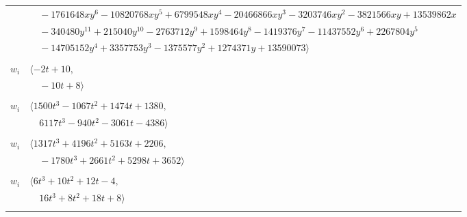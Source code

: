 \documentclass[11pt]{article}
\begin{document}
\begin{longtable}{@{}ll@{}}
 & $\quad -1761648xy^{6}-10820768xy^{5}+6799548xy^{4}-20466866xy^{3}-3203746xy^{2}-3821566xy+13539862x$\\
 & $\quad -340480y^{11}+215040y^{10}-2763712y^{9}+1598464y^{8}-1419376y^{7}-11437552y^{6}+2267804y^{5}$\\
 & $\quad -14705152y^{4}+3357753y^{3}-1375577y^{2}+1274371y+13590073\rangle$\\
\addlinespace[2pt]
\multicolumn{2}{@{}p{0.97\textwidth}@{}}{$i=12$, $D_i=2$, $\rho_{ij}$: $5{:}2, \allowbreak 23{:}1, \allowbreak 41{:}1, \allowbreak 42{:}1, \allowbreak 51{:}1$}\\
$w_i$ & $\langle -2t+10,$\\
 & $\quad -10t+8\rangle$\\
\addlinespace[2pt]
\multicolumn{2}{@{}p{0.97\textwidth}@{}}{$i=13$, $D_i=64$, $\rho_{ij}$: $4{:}1, \allowbreak 6{:}1, \allowbreak 10{:}1, \allowbreak 17{:}1, \allowbreak 23{:}1, \allowbreak 24{:}2, \allowbreak 30{:}1, \allowbreak 31{:}1, \allowbreak 36{:}1, \allowbreak 37{:}2, \allowbreak 39{:}2, \allowbreak 42{:}2, \allowbreak 43{:}1, \allowbreak 47{:}1, \allowbreak 52{:}2, \allowbreak 54{:}1, \allowbreak 71{:}1$}\\
$w_i$ & $\langle 1500t^{3}-1067t^{2}+1474t+1380,$\\
 & $\quad 6117t^{3}-940t^{2}-3061t-4386\rangle$\\
\addlinespace[2pt]
\multicolumn{2}{@{}p{0.97\textwidth}@{}}{$i=14$, $D_i=32$, $\rho_{ij}$: $2{:}1, \allowbreak 3{:}1, \allowbreak 4{:}1, \allowbreak 5{:}2, \allowbreak 6{:}1, \allowbreak 8{:}1, \allowbreak 10{:}1, \allowbreak 15{:}2, \allowbreak 35{:}2, \allowbreak 40{:}1, \allowbreak 41{:}2, \allowbreak 43{:}1, \allowbreak 45{:}2, \allowbreak 48{:}1, \allowbreak 65{:}1, \allowbreak 67{:}2, \allowbreak 71{:}1$}\\
$w_i$ & $\langle 1317t^{3}+4196t^{2}+5163t+2206,$\\
 & $\quad -1780t^{3}+2661t^{2}+5298t+3652\rangle$\\
\addlinespace[2pt]
\multicolumn{2}{@{}p{0.97\textwidth}@{}}{$i=15$, $D_i=2$, $\rho_{ij}$: $7{:}1, \allowbreak 11{:}1, \allowbreak 14{:}1, \allowbreak 24{:}1, \allowbreak 30{:}2, \allowbreak 50{:}2, \allowbreak 60{:}2$}\\
$w_i$ & $\langle 6t^{3}+10t^{2}+12t-4,$\\
 & $\quad 16t^{3}+8t^{2}+18t+8\rangle$\\
\addlinespace[2pt]
\multicolumn{2}{@{}p{0.97\textwidth}@{}}{$i=16$, $D_i=64$, $\rho_{ij}$: $2{:}1, \allowbreak 10{:}2, \allowbreak 11{:}1, \allowbreak 32{:}2, \allowbreak 33{:}1, \allowbreak 35{:}2, \allowbreak 38{:}2, \allowbreak 40{:}1, \allowbreak 41{:}2, \allowbreak 43{:}2, \allowbreak 59{:}2, \allowbreak 65{:}2$}\\

\end{longtable}
\end{document}
